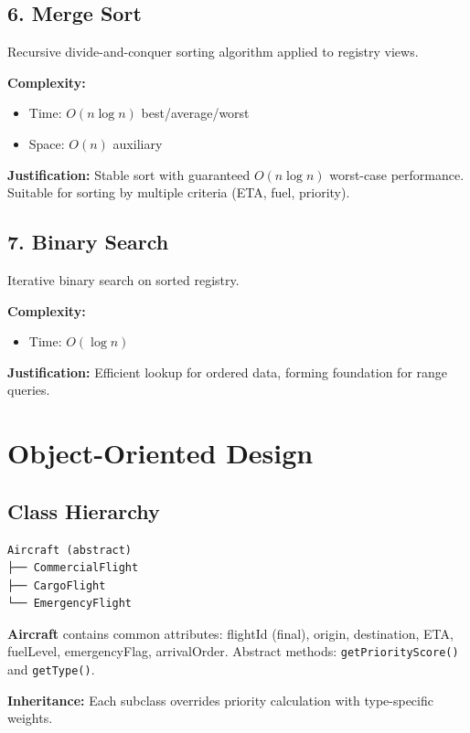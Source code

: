 \documentclass[12pt,a4paper]{article}
\begin{document}
\subsection{6. Merge Sort}

Recursive divide-and-conquer sorting algorithm applied to registry views.

\textbf{Complexity:}
\begin{itemize}
    \item Time: $O(n \log n)$ best/average/worst
    \item Space: $O(n)$ auxiliary
\end{itemize}

\textbf{Justification:} Stable sort with guaranteed $O(n \log n)$ worst-case performance. Suitable for sorting by multiple criteria (ETA, fuel, priority).

\subsection{7. Binary Search}

Iterative binary search on sorted registry.

\textbf{Complexity:}
\begin{itemize}
    \item Time: $O(\log n)$
\end{itemize}

\textbf{Justification:} Efficient lookup for ordered data, forming foundation for range queries.

\section{Object-Oriented Design}

\subsection{Class Hierarchy}

\begin{lstlisting}
Aircraft (abstract)
├── CommercialFlight
├── CargoFlight
└── EmergencyFlight
\end{lstlisting}

\textbf{Aircraft} contains common attributes: flightId (final), origin, destination, ETA, fuelLevel, emergencyFlag, arrivalOrder. Abstract methods: \texttt{getPriorityScore()} and \texttt{getType()}.

\textbf{Inheritance:} Each subclass overrides priority calculation with type-specific weights.
\end{document}
